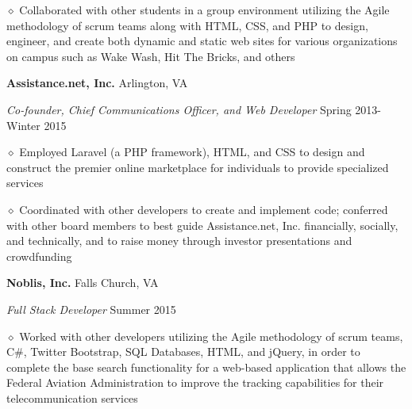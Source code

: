 \documentclass[executivepaper]{extarticle}
\begin{document}
\begin{center}
{\begin{minipage}{7.0in}
{\noindent $\diamond$ {\fontsize{12}{8}\selectfont Collaborated with other students in a group environment utilizing the Agile methodology of scrum teams along with
HTML, CSS, and PHP to design, engineer, and create both dynamic and static web sites for various organizations on campus such as Wake Wash, Hit The Bricks, and others}}

\vspace{2mm}

{\noindent \textbf{\fontsize{12}{8}\selectfont Assistance.net, Inc.}} {\hfill \fontsize{10}{8}\selectfont Arlington, VA}

\vspace{0.25mm}

{\noindent \textit{\fontsize{12}{8}\selectfont Co-founder, Chief Communications Officer, and Web Developer}} {\hfill \fontsize{10}{8}\selectfont Spring 2013-Winter 2015}

\vspace{0.25mm}

{\noindent $\diamond$ {\fontsize{12}{8}\selectfont Employed Laravel (a PHP framework), HTML, and CSS to design and construct the premier online marketplace for individuals to provide specialized services}}

\vspace{0.25mm}

{\noindent $\diamond$ {\fontsize{12}{8}\selectfont Coordinated with other developers to create and implement code; conferred with other board members to best guide Assistance.net, Inc. financially, socially, and technically,
and to raise money through investor presentations and crowdfunding}}

\vspace{2mm}

{\noindent \textbf{\fontsize{12}{8}\selectfont Noblis, Inc.}} {\hfill \fontsize{10}{8}\selectfont Falls Church, VA}

\vspace{0.25mm}

{\noindent \textit{\fontsize{12}{8}\selectfont Full Stack Developer}} {\hfill \fontsize{10}{8}\selectfont Summer 2015}

\vspace{0.25mm}

{\noindent $\diamond$ {\fontsize{12}{8}\selectfont Worked with other developers utilizing the Agile methodology of scrum teams, C\#, Twitter Bootstrap, SQL Databases, HTML, and jQuery, in order to complete
the base search functionality for a web-based application that allows the Federal Aviation Administration to improve the tracking capabilities for their telecommunication services}}


\end{minipage}}
\end{center}
\end{document}
